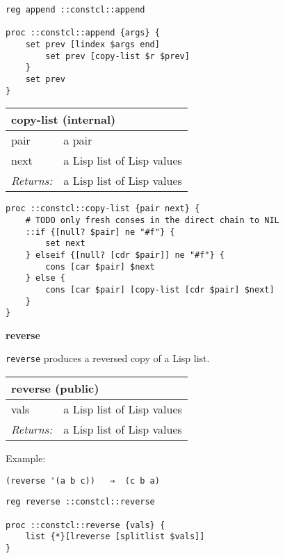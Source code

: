 \documentclass{report}
\begin{document}
\noindent\makebox[\linewidth]{\rule{\linewidth}{0.4pt}}
\begin{lstlisting}
reg append ::constcl::append
 
proc ::constcl::append {args} {
    set prev [lindex $args end]
        set prev [copy-list $r $prev]
    }
    set prev
}
\end{lstlisting}
\noindent\makebox[\linewidth]{\rule{\linewidth}{0.4pt}}
\begin{tabular}{ |l l| }
\hline
\multicolumn{2}{|l|}{copy-list (internal)} \\
\hline
pair & a pair \\
next & a Lisp list of Lisp values \\
\textit{Returns:} & a Lisp list of Lisp values \\
\hline
\end{tabular}

\noindent\makebox[\linewidth]{\rule{\linewidth}{0.4pt}}
\begin{lstlisting}
proc ::constcl::copy-list {pair next} {
    # TODO only fresh conses in the direct chain to NIL
    ::if {[null? $pair] ne "#f"} {
        set next
    } elseif {[null? [cdr $pair]] ne "#f"} {
        cons [car $pair] $next
    } else {
        cons [car $pair] [copy-list [cdr $pair] $next]
    }
}
\end{lstlisting}
\noindent\makebox[\linewidth]{\rule{\linewidth}{0.4pt}}

\textbf{reverse}


\texttt{reverse} produces a reversed copy of a Lisp list.

\begin{tabular}{ |l l| }
\hline
\multicolumn{2}{|l|}{reverse (public)} \\
\hline
vals & a Lisp list of Lisp values \\
\textit{Returns:} & a Lisp list of Lisp values \\
\hline
\end{tabular}


Example:

\noindent\makebox[\linewidth]{\rule{\linewidth}{0.4pt}}
\begin{lstlisting}
(reverse '(a b c))   ⇒  (c b a)
\end{lstlisting}
\noindent\makebox[\linewidth]{\rule{\linewidth}{0.4pt}}
\noindent\makebox[\linewidth]{\rule{\linewidth}{0.4pt}}
\begin{lstlisting}
reg reverse ::constcl::reverse
 
proc ::constcl::reverse {vals} {
    list {*}[lreverse [splitlist $vals]]
}
\end{lstlisting}
\noindent\makebox[\linewidth]{\rule{\linewidth}{0.4pt}}
\end{document}

